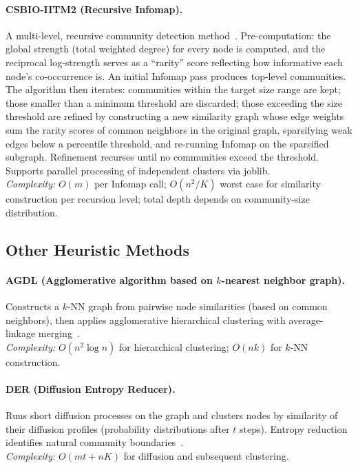 \documentclass[11pt]{article}
\begin{document}
\paragraph{CSBIO-IITM2 (Recursive Infomap).}
A multi-level, recursive community detection method~\citep{choobdar_dream_2019}. Pre-computation: the global strength (total weighted degree) for every node is computed, and the reciprocal log-strength serves as a ``rarity'' score reflecting how informative each node's co-occurrence is. An initial Infomap pass produces top-level communities. The algorithm then iterates: communities within the target size range are kept; those smaller than a minimum threshold are discarded; those exceeding the size threshold are refined by constructing a new similarity graph whose edge weights sum the rarity scores of common neighbors in the original graph, sparsifying weak edges below a percentile threshold, and re-running Infomap on the sparsified subgraph. Refinement recurses until no communities exceed the threshold. Supports parallel processing of independent clusters via joblib.\\
\emph{Complexity:} $O(m)$ per Infomap call; $O(n^2 / K)$ worst case for similarity construction per recursion level; total depth depends on community-size distribution.

\subsection{Other Heuristic Methods}

\paragraph{AGDL (Agglomerative algorithm based on $k$-nearest neighbor graph).}
Constructs a $k$-NN graph from pairwise node similarities (based on common neighbors), then applies agglomerative hierarchical clustering with average-linkage merging~\citep{santo_fortunato_93a74814}.\\
\emph{Complexity:} $O(n^2\log n)$ for hierarchical clustering; $O(nk)$ for $k$-NN construction.

\paragraph{DER (Diffusion Entropy Reducer).}
Runs short diffusion processes on the graph and clusters nodes by similarity of their diffusion profiles (probability distributions after $t$ steps). Entropy reduction identifies natural community boundaries~\citep{santo_fortunato_93a74814}.\\
\emph{Complexity:} $O(mt + nK)$ for diffusion and subsequent clustering.
\end{document}
